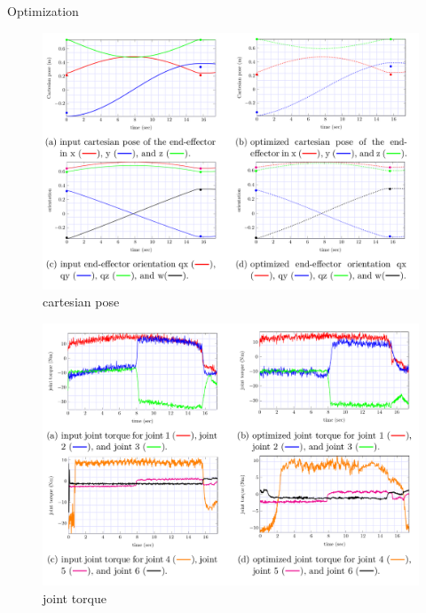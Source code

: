 \begin{frame}{Optimization}
	
	\begin{figure}	
		\centering %
		\includegraphics[height=0.75\textheight, width=\textheight]{pose1.png}
		\caption{cartesian pose}
	\end{figure}
	
\end{frame}

\begin{frame}{}
	
	\begin{figure}	
		\centering %
		\includegraphics[height=0.75\textheight, width=\textheight]{torque.png}
		\caption{joint torque}
	\end{figure}
	
\end{frame}
	
